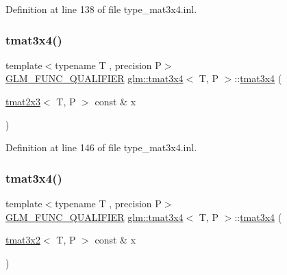 Definition at line 138 of file type\+\_\+mat3x4.\+inl.

\mbox{\label{structglm_1_1tmat3x4_a15f3fac4d543da49854067add7993dc9}} 
\subsubsection{\texorpdfstring{tmat3x4()}{tmat3x4()}\hspace{0.1cm}{\footnotesize\ttfamily [14/22]}}
{\footnotesize\ttfamily template$<$typename T , precision P$>$ \\
\mbox{\hyperlink{setup_8hpp_a33fdea6f91c5f834105f7415e2a64407}{G\+L\+M\+\_\+\+F\+U\+N\+C\+\_\+\+Q\+U\+A\+L\+I\+F\+I\+ER}} \mbox{\hyperlink{structglm_1_1tmat3x4}{glm\+::tmat3x4}}$<$ T, P $>$\+::\mbox{\hyperlink{structglm_1_1tmat3x4}{tmat3x4}} (\begin{DoxyParamCaption}\item[{\mbox{\hyperlink{structglm_1_1tmat2x3}{tmat2x3}}$<$ T, P $>$ const \&}]{x }\end{DoxyParamCaption})}



Definition at line 146 of file type\+\_\+mat3x4.\+inl.

\mbox{\label{structglm_1_1tmat3x4_ab235cb72196b66b354ca6db5b3de36ab}} 
\subsubsection{\texorpdfstring{tmat3x4()}{tmat3x4()}\hspace{0.1cm}{\footnotesize\ttfamily [15/22]}}
{\footnotesize\ttfamily template$<$typename T , precision P$>$ \\
\mbox{\hyperlink{setup_8hpp_a33fdea6f91c5f834105f7415e2a64407}{G\+L\+M\+\_\+\+F\+U\+N\+C\+\_\+\+Q\+U\+A\+L\+I\+F\+I\+ER}} \mbox{\hyperlink{structglm_1_1tmat3x4}{glm\+::tmat3x4}}$<$ T, P $>$\+::\mbox{\hyperlink{structglm_1_1tmat3x4}{tmat3x4}} (\begin{DoxyParamCaption}\item[{\mbox{\hyperlink{structglm_1_1tmat3x2}{tmat3x2}}$<$ T, P $>$ const \&}]{x }\end{DoxyParamCaption})}



